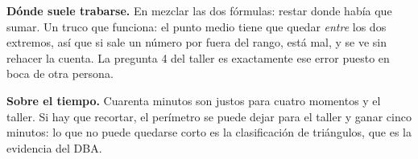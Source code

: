 \documentclass[11pt]{article}
\begin{document}
\begin{nota}
\textbf{Dónde suele trabarse.} En mezclar las dos fórmulas: restar donde había que sumar. Un
truco que funciona: el punto medio tiene que quedar \emph{entre} los dos extremos, así que si
sale un número por fuera del rango, está mal, y se ve sin rehacer la cuenta. La pregunta 4 del
taller es exactamente ese error puesto en boca de otra persona.
\end{nota}

\begin{nota}
\textbf{Sobre el tiempo.} Cuarenta minutos son justos para cuatro momentos y el taller. Si hay
que recortar, el perímetro se puede dejar para el taller y ganar cinco minutos: lo que no
puede quedarse corto es la clasificación de triángulos, que es la evidencia del DBA.
\end{nota}
\end{document}
